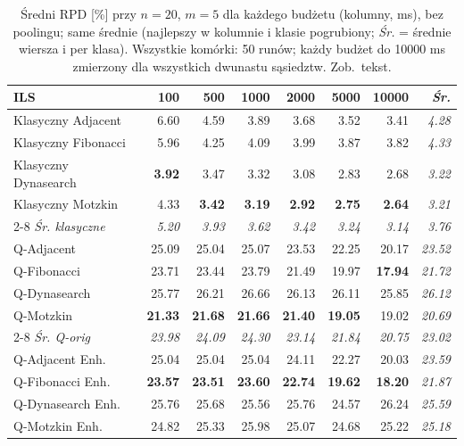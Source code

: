 \documentclass[11pt,a4paper]{article}
\begin{document}
\begin{table}[h]
\centering
\caption{Średni RPD [\%] przy $n=20$, $m=5$ dla każdego budżetu
  (kolumny, ms), bez poolingu; same średnie (najlepszy w kolumnie
  i klasie pogrubiony; \emph{Śr.} = średnie wiersza i per klasa).
  Wszystkie komórki: 50 runów; każdy budżet do 10000 ms zmierzony dla
  wszystkich dwunastu sąsiedztw. Zob.\ tekst.}
\label{tab:rpd_n20_tl}
\footnotesize
\renewcommand{\arraystretch}{0.95}
\begin{tabular}{@{}lrrrrrr@{\quad}r@{}}
\toprule
ILS & 100 & 500 & 1000 & 2000 & 5000 & 10000 & \emph{Śr.} \\
\midrule
Klasyczny Adjacent   &  6.60 &  4.59 &  3.89 &  3.68 &  3.52 &  3.41 & \emph{4.28} \\
Klasyczny Fibonacci  &  5.96 &  4.25 &  4.09 &  3.99 &  3.87 &  3.82 & \emph{4.33} \\
Klasyczny Dynasearch &  \textbf{3.92} &  3.47 &  3.32 &  3.08 &  2.83 &  2.68 & \emph{3.22} \\
Klasyczny Motzkin    &  4.33 &  \textbf{3.42} &  \textbf{3.19} &  \textbf{2.92} &  \textbf{2.75} &  \textbf{2.64} & \emph{3.21} \\
\cmidrule(l){2-8}
\emph{Śr. klasyczne} & \emph{5.20} & \emph{3.93} & \emph{3.62} & \emph{3.42} & \emph{3.24} & \emph{3.14} & \emph{3.76} \\
\midrule
Q-Adjacent           & 25.09 & 25.04 & 25.07 & 23.53 & 22.25 & 20.17 & \emph{23.52} \\
Q-Fibonacci          & 23.71 & 23.44 & 23.79 & 21.49 & 19.97 & \textbf{17.94} & \emph{21.72} \\
Q-Dynasearch         & 25.77 & 26.21 & 26.66 & 26.13 & 26.11 & 25.85 & \emph{26.12} \\
Q-Motzkin            & \textbf{21.33} & \textbf{21.68} & \textbf{21.66} & \textbf{21.40} & \textbf{19.05} & 19.02 & \emph{20.69} \\
\cmidrule(l){2-8}
\emph{Śr. Q-orig}    & \emph{23.98} & \emph{24.09} & \emph{24.30} & \emph{23.14} & \emph{21.84} & \emph{20.75} & \emph{23.02} \\
\midrule
Q-Adjacent Enh.      & 25.04 & 25.04 & 25.04 & 24.11 & 22.27 & 20.03 & \emph{23.59} \\
Q-Fibonacci Enh.     & \textbf{23.57} & \textbf{23.51} & \textbf{23.60} & \textbf{22.74} & \textbf{19.62} & \textbf{18.20} & \emph{21.87} \\
Q-Dynasearch Enh.    & 25.76 & 25.68 & 25.56 & 25.76 & 24.57 & 26.24 & \emph{25.59} \\
Q-Motzkin Enh.       & 24.82 & 25.33 & 25.98 & 25.07 & 24.68 & 25.22 & \emph{25.18} \\

\end{tabular}
\end{table}
\end{document}
